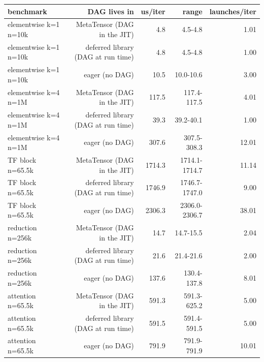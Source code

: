 \begin{tabular}{lrrrr}
\toprule
benchmark & DAG lives in & us/iter & range & launches/iter \\
\midrule
elementwise k=1 n=10k & MetaTensor (DAG in the JIT) & 4.8 & 4.5-4.8 & 1.01 \\
elementwise k=1 n=10k & deferred library (DAG at run time) & 4.8 & 4.5-4.8 & 1.00 \\
elementwise k=1 n=10k & eager (no DAG) & 10.5 & 10.0-10.6 & 3.00 \\
elementwise k=4 n=1M & MetaTensor (DAG in the JIT) & 117.5 & 117.4-117.5 & 4.01 \\
elementwise k=4 n=1M & deferred library (DAG at run time) & 39.3 & 39.2-40.1 & 1.00 \\
elementwise k=4 n=1M & eager (no DAG) & 307.6 & 307.5-308.3 & 12.01 \\
TF block n=65.5k & MetaTensor (DAG in the JIT) & 1714.3 & 1714.1-1714.7 & 11.14 \\
TF block n=65.5k & deferred library (DAG at run time) & 1746.9 & 1746.7-1747.0 & 9.00 \\
TF block n=65.5k & eager (no DAG) & 2306.3 & 2306.0-2306.7 & 38.01 \\
reduction n=256k & MetaTensor (DAG in the JIT) & 14.7 & 14.7-15.5 & 2.04 \\
reduction n=256k & deferred library (DAG at run time) & 21.6 & 21.4-21.6 & 2.00 \\
reduction n=256k & eager (no DAG) & 137.6 & 130.4-137.8 & 8.01 \\
attention n=65.5k & MetaTensor (DAG in the JIT) & 591.3 & 591.3-625.2 & 5.00 \\
attention n=65.5k & deferred library (DAG at run time) & 591.5 & 591.4-591.5 & 5.00 \\
attention n=65.5k & eager (no DAG) & 791.9 & 791.9-791.9 & 10.01 \\
\bottomrule
\end{tabular}
